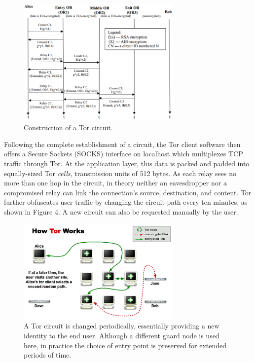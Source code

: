 \begin{figure}[htbp]
\centering
\begin{minipage}{8 cm}
    \includegraphics[width=80mm]{images/circuit-construction.png}
    \caption{Construction of a Tor circuit.}
\end{minipage}
\end{figure}

Following the complete establishment of a circuit, the Tor client software then offers a Secure Sockets (SOCKS) interface on localhost which multiplexes TCP traffic through Tor. At the application layer, this data is packed and padded into equally-sized Tor \textit{cells}, transmission units of 512 bytes. As each relay sees no more than one hop in the circuit, in theory neither an eavesdropper nor a compromised relay can link the connection's source, destination, and content. Tor further obfuscates user traffic by changing the circuit path every ten minutes,\cite{McCoy2008} as shown in Figure 4. A new circuit can also be requested manually by the user.

\begin{figure}[htbp]
\centering
\begin{minipage}{8 cm}
  \includegraphics[width=80mm]{images/circuit-change-1-4.png}
  \caption{A Tor circuit is changed periodically, essentially providing a new identity to the end user. Although a different guard node is used here, in practice the choice of entry point is preserved for extended periods of time.\cite{TorOverview}}
\end{minipage}
\end{figure}

